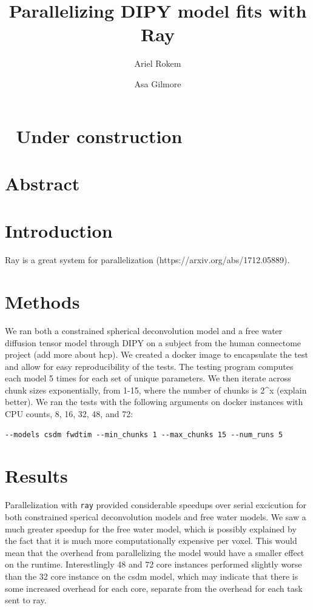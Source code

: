\documentclass[
  letterpaper,
  DIV=11,
  numbers=noendperiod]{scrartcl}
\title{Parallelizing DIPY model fits with Ray}
\author{Ariel Rokem \and Asa Gilmore}
\date{}
\begin{document}
\maketitle

\section{🚧 Under construction 🚧}\label{under-construction}

\section{Abstract}\label{abstract}

\section{Introduction}\label{introduction}

Ray is a great system for parallelization
(https://arxiv.org/abs/1712.05889).

\section{Methods}\label{methods}

We ran both a constrained spherical deconvolution model and a free water
diffusion tensor model through DIPY on a subject from the human
connectome project (add more about hcp). We created a docker image to
encapsulate the test and allow for easy reproducibility of the tests.
The testing program computes each model 5 times for each set of unique
parameters. We then iterate across chunk sizes exponentially, from 1-15,
where the number of chunks is 2\^{}x (explain better). We ran the tests
with the following arguments on docker instances with CPU counts, 8, 16,
32, 48, and 72:

\begin{verbatim}
--models csdm fwdtim --min_chunks 1 --max_chunks 15 --num_runs 5
\end{verbatim}

\section{Results}\label{results}

Parallelization with \texttt{ray} provided considerable speedups over
serial excicution for both constrained sperical deconvolution models and
free water models. We saw a much greater speedup for the free water
model, which is possibly explained by the fact that it is much more
computationally expensive per voxel. This would mean that the overhead
from parallelizing the model would have a smaller effect on the runtime.
Interestlingly 48 and 72 core instances performed slightly worse than
the 32 core instance on the csdm model, which may indicate that there is
some increased overhead for each core, separate from the overhead for
each task sent to ray.
\end{document}
